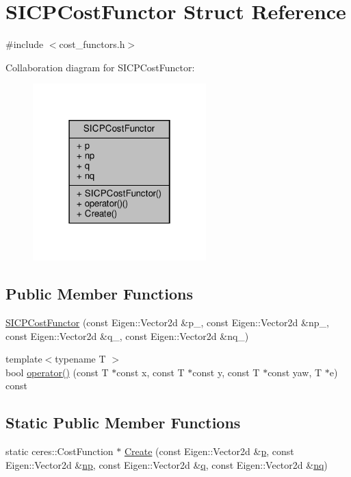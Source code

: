 \hypertarget{structSICPCostFunctor}{}\section{S\+I\+C\+P\+Cost\+Functor Struct Reference}
\label{structSICPCostFunctor}


{\ttfamily \#include $<$cost\+\_\+functors.\+h$>$}



Collaboration diagram for S\+I\+C\+P\+Cost\+Functor\+:\nopagebreak
\begin{figure}[H]
\begin{center}
\leavevmode
\includegraphics[width=190pt]{d8/d7b/structSICPCostFunctor__coll__graph}
\end{center}
\end{figure}
\subsection*{Public Member Functions}
\begin{DoxyCompactItemize}
\item 
\hyperlink{structSICPCostFunctor_a67ffe72c3bf1b99e10725184cef79604}{S\+I\+C\+P\+Cost\+Functor} (const Eigen\+::\+Vector2d \&p\+\_\+, const Eigen\+::\+Vector2d \&np\+\_\+, const Eigen\+::\+Vector2d \&q\+\_\+, const Eigen\+::\+Vector2d \&nq\+\_\+)
\item 
{\footnotesize template$<$typename T $>$ }\\bool \hyperlink{structSICPCostFunctor_a6153374b01d7e00d6c387006d202993e}{operator()} (const T $\ast$const x, const T $\ast$const y, const T $\ast$const yaw, T $\ast$e) const
\end{DoxyCompactItemize}
\subsection*{Static Public Member Functions}
\begin{DoxyCompactItemize}
\item 
static ceres\+::\+Cost\+Function $\ast$ \hyperlink{structSICPCostFunctor_afec70bde5ba0721191473ab89e32b8f4}{Create} (const Eigen\+::\+Vector2d \&\hyperlink{structSICPCostFunctor_a79feb9473e7de7507682b8631c997fd5}{p}, const Eigen\+::\+Vector2d \&\hyperlink{structSICPCostFunctor_ab54300b932172659d1490eaef9d9bd24}{np}, const Eigen\+::\+Vector2d \&\hyperlink{structSICPCostFunctor_abf544d510d7f9f1044b8ded8a6974ca0}{q}, const Eigen\+::\+Vector2d \&\hyperlink{structSICPCostFunctor_a1972078dd4e688e490e9dc006411091b}{nq})
\end{DoxyCompactItemize}
